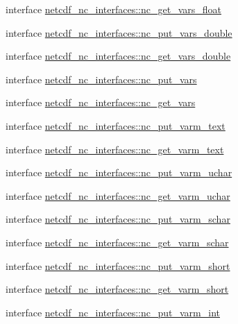 \begin{DoxyCompactItemize}
\item 
interface \hyperlink{interfacenetcdf__nc__interfaces_1_1nc__get__vars__float}{netcdf\+\_\+nc\+\_\+interfaces\+::nc\+\_\+get\+\_\+vars\+\_\+float}
\item 
interface \hyperlink{interfacenetcdf__nc__interfaces_1_1nc__put__vars__double}{netcdf\+\_\+nc\+\_\+interfaces\+::nc\+\_\+put\+\_\+vars\+\_\+double}
\item 
interface \hyperlink{interfacenetcdf__nc__interfaces_1_1nc__get__vars__double}{netcdf\+\_\+nc\+\_\+interfaces\+::nc\+\_\+get\+\_\+vars\+\_\+double}
\item 
interface \hyperlink{interfacenetcdf__nc__interfaces_1_1nc__put__vars}{netcdf\+\_\+nc\+\_\+interfaces\+::nc\+\_\+put\+\_\+vars}
\item 
interface \hyperlink{interfacenetcdf__nc__interfaces_1_1nc__get__vars}{netcdf\+\_\+nc\+\_\+interfaces\+::nc\+\_\+get\+\_\+vars}
\item 
interface \hyperlink{interfacenetcdf__nc__interfaces_1_1nc__put__varm__text}{netcdf\+\_\+nc\+\_\+interfaces\+::nc\+\_\+put\+\_\+varm\+\_\+text}
\item 
interface \hyperlink{interfacenetcdf__nc__interfaces_1_1nc__get__varm__text}{netcdf\+\_\+nc\+\_\+interfaces\+::nc\+\_\+get\+\_\+varm\+\_\+text}
\item 
interface \hyperlink{interfacenetcdf__nc__interfaces_1_1nc__put__varm__uchar}{netcdf\+\_\+nc\+\_\+interfaces\+::nc\+\_\+put\+\_\+varm\+\_\+uchar}
\item 
interface \hyperlink{interfacenetcdf__nc__interfaces_1_1nc__get__varm__uchar}{netcdf\+\_\+nc\+\_\+interfaces\+::nc\+\_\+get\+\_\+varm\+\_\+uchar}
\item 
interface \hyperlink{interfacenetcdf__nc__interfaces_1_1nc__put__varm__schar}{netcdf\+\_\+nc\+\_\+interfaces\+::nc\+\_\+put\+\_\+varm\+\_\+schar}
\item 
interface \hyperlink{interfacenetcdf__nc__interfaces_1_1nc__get__varm__schar}{netcdf\+\_\+nc\+\_\+interfaces\+::nc\+\_\+get\+\_\+varm\+\_\+schar}
\item 
interface \hyperlink{interfacenetcdf__nc__interfaces_1_1nc__put__varm__short}{netcdf\+\_\+nc\+\_\+interfaces\+::nc\+\_\+put\+\_\+varm\+\_\+short}
\item 
interface \hyperlink{interfacenetcdf__nc__interfaces_1_1nc__get__varm__short}{netcdf\+\_\+nc\+\_\+interfaces\+::nc\+\_\+get\+\_\+varm\+\_\+short}
\item 
interface \hyperlink{interfacenetcdf__nc__interfaces_1_1nc__put__varm__int}{netcdf\+\_\+nc\+\_\+interfaces\+::nc\+\_\+put\+\_\+varm\+\_\+int}

\end{DoxyCompactItemize}
